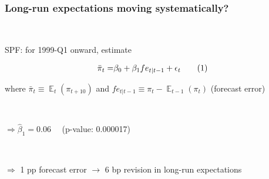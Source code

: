 \documentclass[10pt]{beamer}
\newcommand\numberthis{\addtocounter{equation}{1}\tag{\theequation}} %
\DeclareMathOperator{\E}{\mathbb{E}}
\begin{document}
\begin{frame}
\frametitle{Long-run expectations moving systematically?}\label{systematically}

\

SPF: for 1999-Q1 onward, estimate

\begin{align*}
\bar{\pi}_t = & \beta_0 + \beta_1 fe_{t|t-1} + \epsilon_t \numberthis \\
\end{align*}

where $\bar{\pi}_t  \equiv \E_t(\pi_{t+10})$ and $fe_{t|t-1}  \equiv \pi_t - \E_{t-1}(\pi_t) $ (forecast error)


\
\pause
\

$\Rightarrow \hat{\beta}_1 = 0.06 \quad $  (p-value: 0.000017)

\


$\Rightarrow$ 1 pp forecast error $\rightarrow$ 6 bp revision in long-run expectations

%
%

\vspace{0.5cm}

\hfill \hyperlink{further_evidence}{}
\end{frame}
\end{document}

